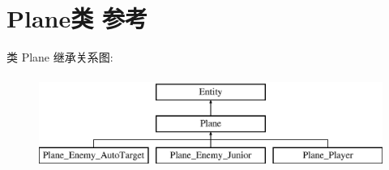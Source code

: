 \hypertarget{class_plane}{}\section{Plane类 参考}
\label{class_plane}
类 Plane 继承关系图\+:\begin{figure}[H]
\begin{center}
\leavevmode
\includegraphics[height=3.000000cm]{class_plane}
\end{center}
\end{figure}
